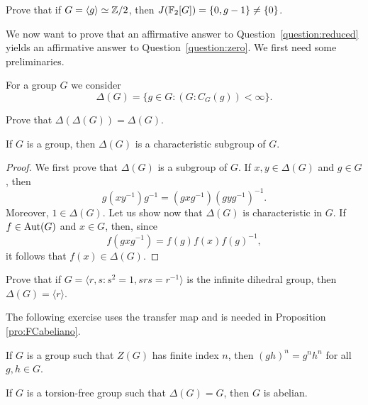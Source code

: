 \begin{exercise}
	Prove that if $G=\langle g\rangle\simeq\mathbb{Z}/2$, then 
	$J(\mathbb{F}_2[G])=\{0,g-1\}\ne\{0\}$. 
\end{exercise}


We now want to prove that an affirmative answer to 
Question~\ref{question:reduced} yields an affirmative answer to Question~\ref{question:zero}. We first need some preliminaries. 

For a group $G$ we consider
\[
        \Delta(G)=\{g\in G:(G:C_G(g))<\infty\}.
\]

\begin{exercise}
    Prove that $\Delta(\Delta(G))=\Delta(G)$.
\end{exercise}

\begin{proposition}
    If $G$ is a group, then $\Delta(G)$
    is a characteristic subgroup of $G$.
\end{proposition}

\begin{proof}
        We first prove that $\Delta(G)$ is a subgroup of $G$. If $x,y\in\Delta(G)$
        and $g\in G$, then 
        \[
        g(xy^{-1})g^{-1}=(gxg^{-1})(gyg^{-1})^{-1}.
        \]
        Moreover,
        $1\in\Delta(G)$. Let us show now that $\Delta(G)$ is characteristic in $G$. If
        $f\in\operatorname{Aut}(G)$ and $x\in G$, then, since
        \[
        f(gxg^{-1})=f(g)f(x)f(g)^{-1},
        \]
        it follows that $f(x)\in\Delta(G)$.
\end{proof}


\begin{exercise}
        Prove that if $G=\langle r,s:s^2=1,srs=r^{-1}\rangle$ is the
        infinite dihedral group, then $\Delta(G)=\langle r\rangle$.
\end{exercise}

The following exercise uses the transfer map and
is needed 
in Proposition \ref{pro:FCabeliano}. 

\begin{exercise}
        \label{xca:center}
        If $G$ is a group such that $Z(G)$ has finite index $n$, then
        $(gh)^n=g^nh^n$ for all $g,h\in G$.
\end{exercise}

\begin{proposition}
	\label{pro:FCabeliano}
	If $G$ is a torsion-free group such 
	that $\Delta(G)=G$, then $G$ is abelian.
\end{proposition}

